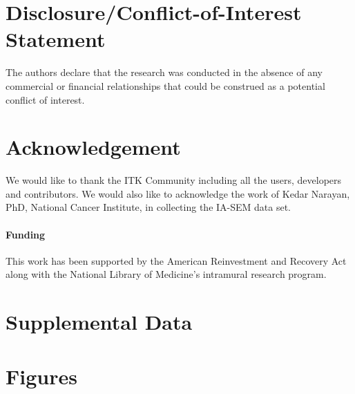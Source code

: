 \documentclass{frontiersMED} %
\begin{document}
\section*{Disclosure/Conflict-of-Interest Statement}
The authors declare that the research was conducted in the absence of any commercial or financial relationships that could be construed as a potential conflict of interest.

\section*{Acknowledgement}

We would like to thank the ITK Community including all the users,
developers and contributors. We would also like to acknowledge the
work of Kedar Narayan, PhD, National Cancer Institute,  in collecting
the IA-SEM data set. 
 
\paragraph{Funding\textcolon}

This work has been supported by the American
Reinvestment and Recovery Act along with the National Library of
Medicine's intramural research program.

\section*{Supplemental Data}




\section*{Figures}

\end{document}
